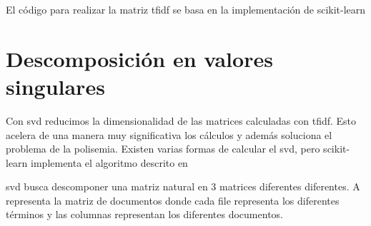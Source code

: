 \documentclass[withindex, glossary]{cam-thesis}
\begin{document}
El código para realizar la matriz \acrshort{tfidf} se basa en la implementación de scikit-learn\cite{scikit-learn}

\section{Descomposición en valores singulares}
Con \acrfull{svd} reducimos la dimensionalidad de las matrices calculadas con \acrshort{tfidf}. Esto acelera de una manera muy significativa los cálculos y además soluciona el problema de la polisemia. Existen varias formas de calcular el \acrshort{svd}, pero scikit-learn implementa el algoritmo descrito en 

\acrshort{svd} busca descomponer una matriz natural en 3 matrices diferentes diferentes. A representa la matriz de documentos donde cada file representa los diferentes términos y las columnas representan los diferentes documentos.\cite{stanford-svd}
\end{document}
